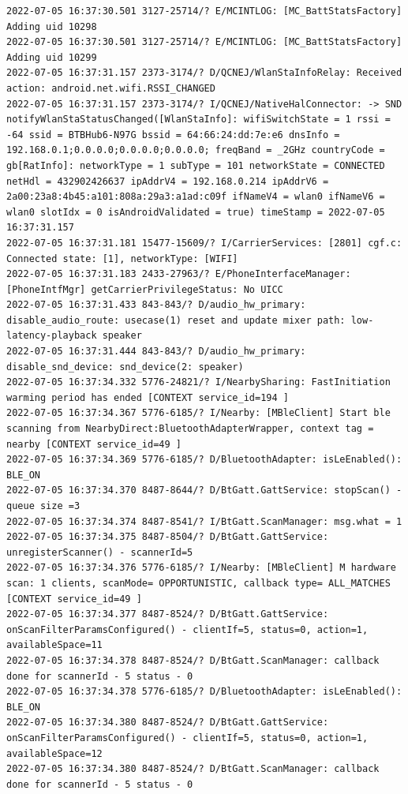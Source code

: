 \documentclass[a4paper,12pt]{book}
\begin{document}
\begin{lstlisting}
2022-07-05 16:37:30.501 3127-25714/? E/MCINTLOG: [MC_BattStatsFactory] Adding uid 10298
2022-07-05 16:37:30.501 3127-25714/? E/MCINTLOG: [MC_BattStatsFactory] Adding uid 10299
2022-07-05 16:37:31.157 2373-3174/? D/QCNEJ/WlanStaInfoRelay: Received action: android.net.wifi.RSSI_CHANGED
2022-07-05 16:37:31.157 2373-3174/? I/QCNEJ/NativeHalConnector: -> SND notifyWlanStaStatusChanged([WlanStaInfo]: wifiSwitchState = 1 rssi = -64 ssid = BTBHub6-N97G bssid = 64:66:24:dd:7e:e6 dnsInfo = 192.168.0.1;0.0.0.0;0.0.0.0;0.0.0.0; freqBand = _2GHz countryCode = gb[RatInfo]: networkType = 1 subType = 101 networkState = CONNECTED netHdl = 432902426637 ipAddrV4 = 192.168.0.214 ipAddrV6 = 2a00:23a8:4b45:a101:808a:29a3:a1ad:c09f ifNameV4 = wlan0 ifNameV6 = wlan0 slotIdx = 0 isAndroidValidated = true) timeStamp = 2022-07-05 16:37:31.157
2022-07-05 16:37:31.181 15477-15609/? I/CarrierServices: [2801] cgf.c: Connected state: [1], networkType: [WIFI]
2022-07-05 16:37:31.183 2433-27963/? E/PhoneInterfaceManager: [PhoneIntfMgr] getCarrierPrivilegeStatus: No UICC
2022-07-05 16:37:31.433 843-843/? D/audio_hw_primary: disable_audio_route: usecase(1) reset and update mixer path: low-latency-playback speaker
2022-07-05 16:37:31.444 843-843/? D/audio_hw_primary: disable_snd_device: snd_device(2: speaker)
2022-07-05 16:37:34.332 5776-24821/? I/NearbySharing: FastInitiation warming period has ended [CONTEXT service_id=194 ]
2022-07-05 16:37:34.367 5776-6185/? I/Nearby: [MBleClient] Start ble scanning from NearbyDirect:BluetoothAdapterWrapper, context tag = nearby [CONTEXT service_id=49 ]
2022-07-05 16:37:34.369 5776-6185/? D/BluetoothAdapter: isLeEnabled(): BLE_ON
2022-07-05 16:37:34.370 8487-8644/? D/BtGatt.GattService: stopScan() - queue size =3
2022-07-05 16:37:34.374 8487-8541/? I/BtGatt.ScanManager: msg.what = 1
2022-07-05 16:37:34.375 8487-8504/? D/BtGatt.GattService: unregisterScanner() - scannerId=5
2022-07-05 16:37:34.376 5776-6185/? I/Nearby: [MBleClient] M hardware scan: 1 clients, scanMode= OPPORTUNISTIC, callback type= ALL_MATCHES [CONTEXT service_id=49 ]
2022-07-05 16:37:34.377 8487-8524/? D/BtGatt.GattService: onScanFilterParamsConfigured() - clientIf=5, status=0, action=1, availableSpace=11
2022-07-05 16:37:34.378 8487-8524/? D/BtGatt.ScanManager: callback done for scannerId - 5 status - 0
2022-07-05 16:37:34.378 5776-6185/? D/BluetoothAdapter: isLeEnabled(): BLE_ON
2022-07-05 16:37:34.380 8487-8524/? D/BtGatt.GattService: onScanFilterParamsConfigured() - clientIf=5, status=0, action=1, availableSpace=12
2022-07-05 16:37:34.380 8487-8524/? D/BtGatt.ScanManager: callback done for scannerId - 5 status - 0

\end{lstlisting}
\end{document}
